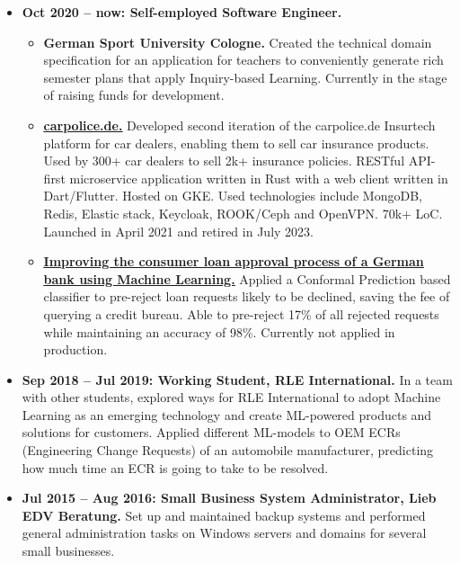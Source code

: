 \documentclass[10pt]{article}
\begin{document}
\begin{itemize}[label={}, leftmargin=*]

\item \textbf{Oct 2020 -- now: Self-employed Software Engineer.}

  \begin{itemize}[label=\bullet, leftmargin=*]
    \item \textbf{German Sport University Cologne.}
      Created the technical domain specification for an
      application for teachers to conveniently generate rich semester
      plans that apply Inquiry-based Learning.
      Currently in the stage of raising funds for development.

    \item \textbf{\underline{\href{https://carpolice.de}{carpolice.de.}}}
      Developed second iteration of the carpolice.de Insurtech platform for car
      dealers, enabling them to sell car insurance products.
      Used by 300+ car dealers to sell 2k+ insurance policies.
      RESTful API-first microservice application written in Rust with
      a web client written in Dart/Flutter.
      Hosted on GKE.
      Used technologies include MongoDB, Redis, Elastic stack,
      Keycloak, ROOK/Ceph and OpenVPN.
      70k+ LoC.
      Launched in April 2021 and retired in July 2023.

    \item \textbf{\underline{\href{https://fassbender.dev/static/cp_for_loan_approval_prediction.pdf}{%
        Improving the consumer loan approval process of a German bank using Machine Learning.}}}
      Applied a Conformal Prediction based classifier to pre-reject
      loan requests likely to be declined, saving the fee of querying
      a credit bureau.
      Able to pre-reject 17\% of all rejected requests while
      maintaining an accuracy of 98\%.
      Currently not applied in production.
  \end{itemize}

\item \textbf{Sep 2018 -- Jul 2019: Working Student, RLE International.}
In a team with other students, explored ways for RLE
International to adopt Machine Learning as an emerging technology and
create ML-powered products and solutions for customers.
Applied different ML-models to OEM ECRs (Engineering Change Requests)
of an automobile manufacturer, predicting how much time an ECR is
going to take to be resolved.

\item \textbf{Jul 2015 -- Aug 2016: Small Business System Administrator,
Lieb EDV Beratung.}
Set up and maintained backup systems and performed general
administration tasks on Windows servers and domains for several small
businesses.

\end{itemize}
\end{document}
